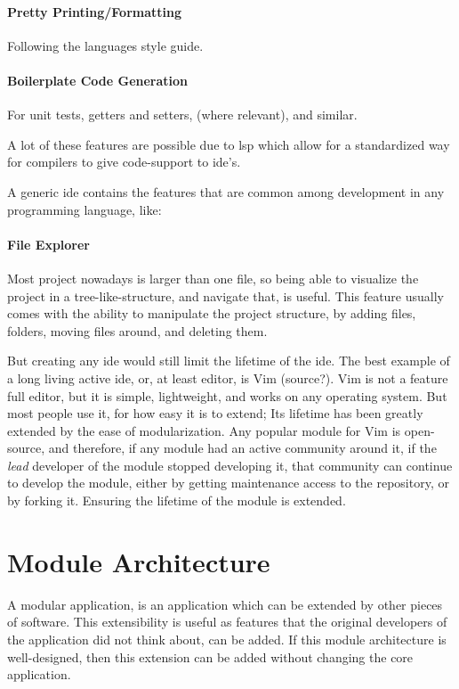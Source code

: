 \paragraph{Pretty Printing/Formatting} Following the languages style guide.

\paragraph{Boilerplate Code Generation} For unit tests, getters and setters,
(where relevant), and similar.

A lot of these features are possible due to \gls{lsp} which allow for a
standardized way for compilers to give code-support to \gls{ide}'s.

A generic \gls{ide} contains the features that are common among development in
any programming language, like:

\paragraph{File Explorer} Most project nowadays is larger than one file, so
being able to visualize the project in a tree-like-structure, and navigate that,
is useful. This feature usually comes with the ability to manipulate the project
structure, by adding files, folders, moving files around, and deleting them.

But creating any \gls{ide} would still limit the lifetime of the \gls{ide}.
The best example of a long living active \gls{ide}, or, at least editor, is Vim
(source?). Vim is not a feature full editor, but it is simple, lightweight, and
works on any operating system. But most people use it, for how easy it is to
extend; Its lifetime has been greatly extended by the ease of modularization.
Any popular module for Vim is open-source, and therefore, if any module had an
active community around it, if the \textit{lead} developer of the module stopped
developing it, that community can continue to develop the module, either by
getting maintenance access to the repository, or by forking it. Ensuring the
lifetime of the module is extended.

\section{Module Architecture}


A modular application, is an application which can be extended by other pieces
of software. This extensibility is useful as features that the original
developers of the application did not think about, can be added. If this module
architecture is well-designed, then this extension can be added without changing
the core application.

